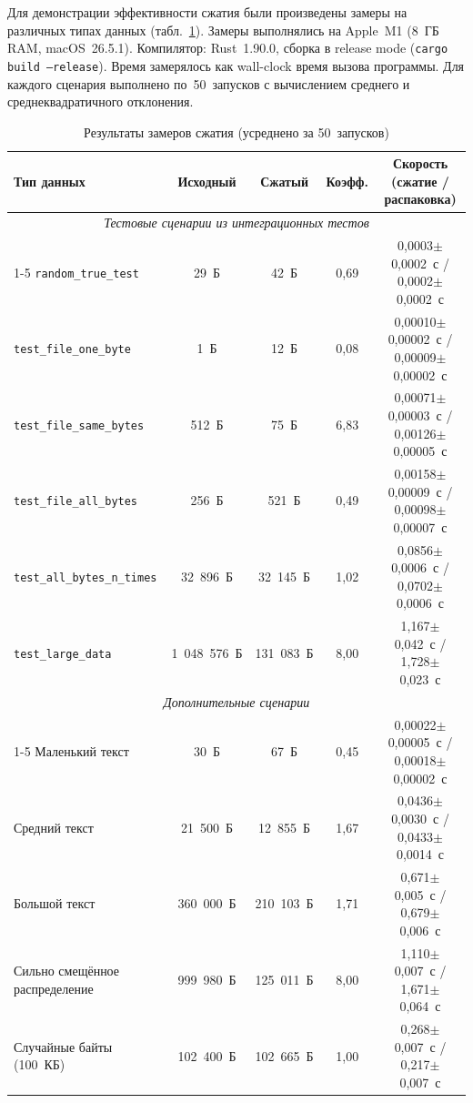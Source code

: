 \documentclass[a4paper]{article}
\begin{document}
Для демонстрации эффективности сжатия были произведены замеры
на различных типах данных (табл.~\ref{tab:benchmarks}). 
Замеры выполнялись на Apple~M1 (8~ГБ RAM, macOS~26.5.1). 
Компилятор: Rust~1.90.0, сборка в release mode (\texttt{cargo build --release}). 
Время замерялось как wall-clock время вызова программы. 
Для каждого сценария выполнено по~50~запусков с вычислением среднего и среднеквадратичного отклонения.

\begin{table}[h]
\centering
\caption{Результаты замеров сжатия (усреднено за 50~запусков)}\label{tab:benchmarks}
\begin{tabular}{lcccc}
\toprule
\textbf{Тип данных} & \textbf{Исходный} & \textbf{Сжатый} & \textbf{Коэфф.} & \textbf{Скорость (сжатие / распаковка)} \\
\midrule
\multicolumn{5}{c}{\emph{Тестовые сценарии из интеграционных тестов}} \\
\cmidrule(lr){1-5}
\texttt{random\_true\_test} & 29~Б    & 42~Б  & 0,69 & 0,0003$\pm$0,0002~с / 0,0002$\pm$0,0002~с \\
\texttt{test\_file\_one\_byte} & 1~Б & 12~Б & 0,08 & 0,00010$\pm$0,00002~с / 0,00009$\pm$0,00002~с \\
\texttt{test\_file\_same\_bytes} & 512~Б & 75~Б & 6,83 & 0,00071$\pm$0,00003~с / 0,00126$\pm$0,00005~с \\
\texttt{test\_file\_all\_bytes} & 256~Б & 521~Б & 0,49 & 0,00158$\pm$0,00009~с / 0,00098$\pm$0,00007~с \\
\texttt{test\_all\_bytes\_n\_times} & 32~896~Б & 32~145~Б & 1,02 & 0,0856$\pm$0,0006~с / 0,0702$\pm$0,0006~с \\
\texttt{test\_large\_data} & 1~048~576~Б & 131~083~Б & 8,00 & 1,167$\pm$0,042~с / 1,728$\pm$0,023~с \\
\midrule

\multicolumn{5}{c}{\emph{Дополнительные сценарии}} \\
\cmidrule(lr){1-5}
Маленький текст & 30~Б & 67~Б & 0,45 & 0,00022$\pm$0,00005~с / 0,00018$\pm$0,00002~с \\
Средний текст & 21~500~Б & 12~855~Б & 1,67 & 0,0436$\pm$0,0030~с / 0,0433$\pm$0,0014~с \\
Большой текст & 360~000~Б & 210~103~Б & 1,71 & 0,671$\pm$0,005~с / 0,679$\pm$0,006~с \\
Сильно смещённое распределение & 999~980~Б & 125~011~Б & 8,00 & 1,110$\pm$0,007~с / 1,671$\pm$0,064~с \\
Случайные байты (100~КБ) & 102~400~Б & 102~665~Б & 1,00 & 0,268$\pm$0,007~с / 0,217$\pm$0,007~с \\
\bottomrule
\end{tabular}
\end{table}
\end{document}
